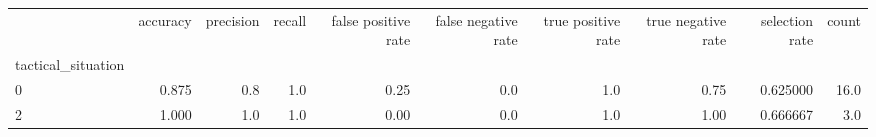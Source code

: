 \begin{tabular}{lrrrrrrrrr}
\toprule
{} &  accuracy &  precision &  recall &  false positive rate &  false negative rate &  true positive rate &  true negative rate &  selection rate &  count \\
tactical\_situation &           &            &         &                      &                      &                     &                     &                 &        \\
\midrule
0                  &     0.875 &        0.8 &     1.0 &                 0.25 &                  0.0 &                 1.0 &                0.75 &        0.625000 &   16.0 \\
2                  &     1.000 &        1.0 &     1.0 &                 0.00 &                  0.0 &                 1.0 &                1.00 &        0.666667 &    3.0 \\
\bottomrule
\end{tabular}
